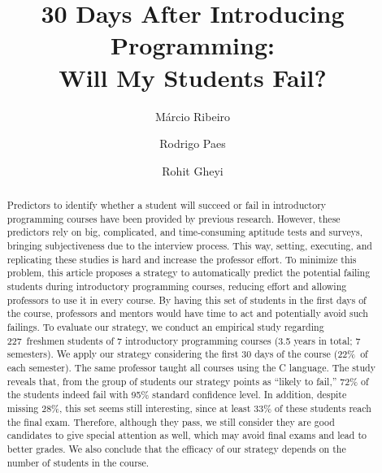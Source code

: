 \documentclass[review]{elsarticle}
\newcommand{\totalStudents}{227~}
\newcommand{\semesterPercentage}{22\%~}
\begin{document}
\begin{frontmatter}

\title{30 Days After Introducing Programming:\\Will My Students Fail?}



\author[ufal]{M\'{a}rcio Ribeiro}

\author[ufal]{Rodrigo Paes}

\author[ufcg]{Rohit Gheyi}

\address[ufal]{Federal University of Alagoas, Macei\'{o}, Brazil}
\address[ufcg]{Federal University of Campina Grande, Campina Grande, Brazil}

\begin{abstract}
Predictors to identify whether a student will succeed or fail in introductory programming courses have been provided by previous research. However, these predictors rely on big, complicated, and time-consuming aptitude tests and surveys, bringing subjectiveness due to the interview process. This way, setting, executing, and replicating these studies is hard and increase the professor effort. To minimize this problem, this article proposes a strategy to automatically predict the potential failing students during introductory programming courses, reducing effort and allowing professors to use it in every course. By having this set of students in the first days of the course, professors and mentors would have time to act and potentially avoid such failings. To evaluate our strategy, we conduct an empirical study regarding \totalStudents freshmen students of 7 introductory programming courses (3.5 years in total; 7 semesters). We apply our strategy considering the first 30 days of the course (\semesterPercentage of each semester). The same professor taught all courses using the C language. The study reveals that, from the group of students our strategy points as ``likely to fail,'' 72\% of the students indeed fail with 95\% standard confidence level. In addition, despite missing 28\%, this set seems still interesting, since at least 33\% of these students reach the final exam. Therefore, although they pass, we still consider they are good candidates to give special attention as well, which may avoid final exams and lead to better grades. We also conclude that the efficacy of our strategy depends on the number of students in the course.



\end{abstract}
\end{frontmatter}
\end{document}
